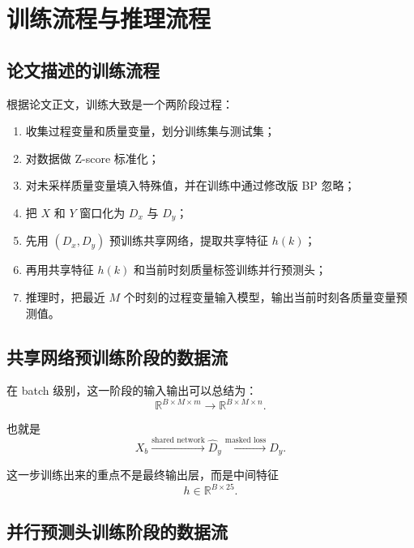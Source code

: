 \documentclass[UTF8]{ctexart}
\begin{document}
\section{训练流程与推理流程}

\subsection{论文描述的训练流程}

根据论文正文，训练大致是一个两阶段过程：
\begin{enumerate}
    \item 收集过程变量和质量变量，划分训练集与测试集；
    \item 对数据做 Z-score 标准化；
    \item 对未采样质量变量填入特殊值，并在训练中通过修改版 BP 忽略；
    \item 把 $X$ 和 $Y$ 窗口化为 $D_x$ 与 $D_y$；
    \item 先用 $(D_x, D_y)$ 预训练共享网络，提取共享特征 $h(k)$；
    \item 再用共享特征 $h(k)$ 和当前时刻质量标签训练并行预测头；
    \item 推理时，把最近 $M$ 个时刻的过程变量输入模型，输出当前时刻各质量变量预测值。
\end{enumerate}

\subsection{共享网络预训练阶段的数据流}

在 batch 级别，这一阶段的输入输出可以总结为：
\begin{equation}
    \mathbb{R}^{B \times M \times m}
    \longrightarrow
    \mathbb{R}^{B \times M \times n}.
\end{equation}

也就是
\begin{equation}
    X_b \xrightarrow{\text{shared network}} \hat{D}_y
    \xrightarrow{\text{masked loss}} D_y.
\end{equation}

这一步训练出来的重点不是最终输出层，而是中间特征
\begin{equation}
    h \in \mathbb{R}^{B \times 25}.
\end{equation}

\subsection{并行预测头训练阶段的数据流}
\end{document}
